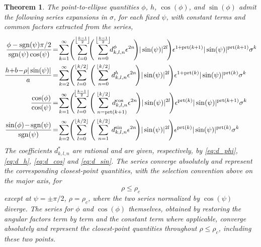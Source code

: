 \documentclass[a4paper]{amsart}
\newtheorem{thm}{Theorem}
\DeclareMathOperator{\sgn}{sgn}
\DeclareMathOperator{\prt}{prt}
\begin{document}
\begin{thm}\label{theorem}
The point-to-ellipse quantities $\phi$, $h$, $\cos(\phi)$, and $\sin(\phi)$ admit the following series expansions in $\sigma$, for each fixed $\psi$, with constant terms and common factors extracted from the series,
%
\begin{align*}
\frac{\phi-\sgn(\psi)\pi/2}{\sgn(\psi)\cos(\psi)}
\!&=\!
\sum_{k=1}^{\infty}\!
\Bigg(\!
\sum_{l=0}^{\left\lfloor\mkern-2mu\frac{k-1}{2}\mkern-2mu\right\rfloor}\!\!\mkern-1mu
\Bigg(\sum_{n=0}^{\left\lfloor\mkern-2mu\frac{k-1}{2}\mkern-2mu\right\rfloor}\!\!d^\phi_{k,l,n}\epsilon^{2n}\!
\Bigg)
|\sin(\psi)|^{2l}\!
\Bigg)\epsilon^{1\mkern-1mu+\mkern-1mu\prt(k\mkern-1mu+\mkern-1mu1)}
|\sin(\psi)|^{\prt(k\mkern-1mu+\mkern-1mu1)}
\sigma^k\\
%
\frac{h\!\mkern-1mu+\mkern-1mu\!b\!-\!\mkern-1mu\rho|\sin(\psi)|}{a}
\!&=\!
\sum_{k=2}^{\infty}\!
\Bigg(\!
\sum_{l=0}^{\lfloor k/2\rfloor}
\Bigg(
\sum_{n=0}^{\lfloor k/2\rfloor}
d^{h}_{k,l,n}
\epsilon^{2n}\!
\Bigg)
|\sin(\psi)|^{2l}\!
\Bigg)
\epsilon^{1+\prt(k)}
|\sin(\psi)|^{\prt(k)}
\sigma^k\\
%
\frac{\cos(\phi)}{\cos(\psi)}
\!&=\!
\sum_{k=1}^{\infty}\!
\Bigg(\!\mkern-2mu
\sum_{l=0}^{\left\lfloor\mkern-2mu\frac{k-1}{2}\mkern-2mu\right\rfloor}
\!\Bigg(\hspace{-8mm}
\sum_{\hspace{8.5mm}n=\prt(k+1)}^{\lfloor k/2\rfloor}
\hspace{-8mm}d^{\cos}_{k,l,n}
\epsilon^{2n}\!
\Bigg)
|\sin(\psi)|^{2l}\!
\Bigg)
\epsilon^{\prt(k)}
|\sin(\psi)|^{\prt(k+1)}
\sigma^k\\
%
\frac{\sin(\phi)\!-\mkern-2mu\sgn(\psi)}{\sgn(\psi)}
\!&=\!
\sum_{k=2}^{\infty}\!
\Bigg(\!
\sum_{l=0}^{\lfloor k/2\rfloor}
\Bigg(
\sum_{n=1}^{\lfloor k/2\rfloor}
d^{\sin}_{k,l,n}
\epsilon^{2n}\!
\Bigg)
|\sin(\psi)|^{2l}\!
\Bigg)
\epsilon^{\prt(k)}
|\sin(\psi)|^{\prt(k)}
\sigma^k
\end{align*}
The coefficients $d^{*}_{k,l,n}$ are rational and are given, respectively, by \eqref{eq:d_phi}, \eqref{eq:d_h}, \eqref{eq:d_cos} and \eqref{eq:d_sin}. The series converge absolutely and represent the corresponding closest-point quantities, with the selection convention above on the major axis, for
\begin{equation*}
\rho\leq\rho_c
\end{equation*}
except at $\psi=\pm\pi/2$, $\rho=\rho_c$, where the two series normalized by $\cos(\psi)$ diverge. The series for $\phi$ and $\cos(\phi)$ themselves, obtained by restoring the angular factors term by term and the constant term where applicable, converge absolutely and represent the closest-point quantities throughout $\rho\leq\rho_c$, including these two points.
\end{thm}
\end{document}
